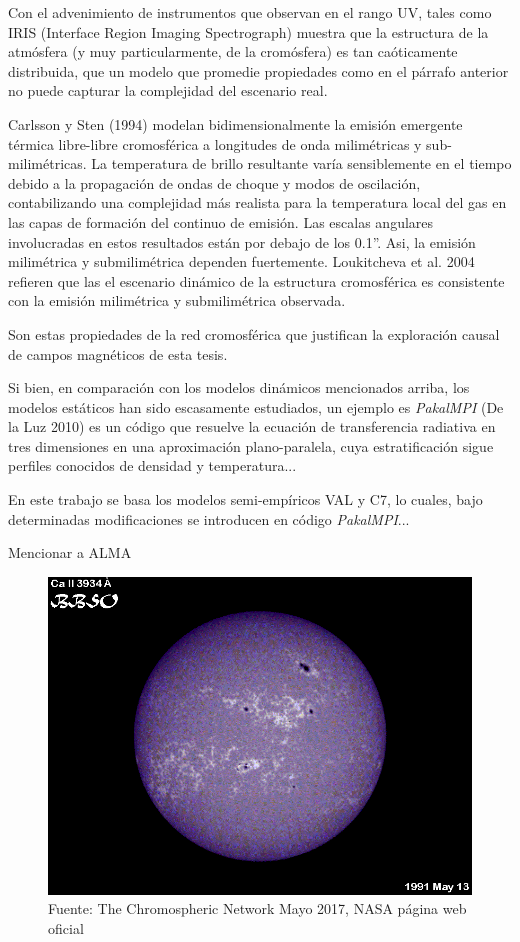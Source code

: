 \documentclass[9pt]{book}
\begin{document}
Con el advenimiento de instrumentos que observan en el rango UV, tales como IRIS (Interface Region Imaging Spectrograph) muestra que la estructura de la atm\'osfera (y muy particularmente, de la crom\'osfera) es tan ca\'oticamente distribuida, que un modelo que promedie propiedades como en el p\'arrafo anterior no puede capturar la complejidad del escenario real.

Carlsson y Sten (1994) modelan bidimensionalmente la emisi\'on emergente t\'ermica libre-libre cromosf\'erica a longitudes de onda milim\'etricas y sub-milim\'etricas. La temperatura de brillo resultante var\'ia sensiblemente en el tiempo debido a la propagaci\'on de ondas de choque y modos de oscilaci\'on, contabilizando una complejidad m\'as realista para la temperatura local del gas en las capas de formaci\'on del continuo de emisi\'on. Las escalas angulares involucradas en estos resultados est\'an por debajo de los 0.1''. Asi, la emisi\'on milim\'etrica y submilim\'etrica dependen fuertemente. Loukitcheva et al. 2004 refieren que las el escenario din\'amico de la estructura cromosf\'erica es consistente con la emisi\'on milim\'etrica y submilim\'etrica observada.

Son estas propiedades de la red cromosf\'erica que justifican la exploraci\'on causal de campos magn\'eticos de esta tesis.

Si bien, en comparaci\'on con los modelos din\'amicos mencionados arriba, los modelos est\'aticos han sido escasamente estudiados, un ejemplo es \emph{PakalMPI} (De la Luz 2010) es un c\'odigo que resuelve la ecuaci\'on de transferencia radiativa en tres dimensiones en una aproximaci\'on plano-paralela, cuya estratificaci\'on sigue perfiles conocidos de densidad y temperatura...

En este trabajo se basa los modelos semi-emp\'iricos VAL y C7, lo cuales, bajo determinadas modificaciones se introducen en c\'odigo \emph{PakalMPI}...

Mencionar a ALMA


\begin{figure}[h]

\centering
\includegraphics[scale=0.3]{CAII3934}
\caption{Fuente: The Chromospheric Network Mayo 2017, NASA p\'agina web oficial}
\label{fig:chromosphericnet}
\end{figure}
\end{document}
